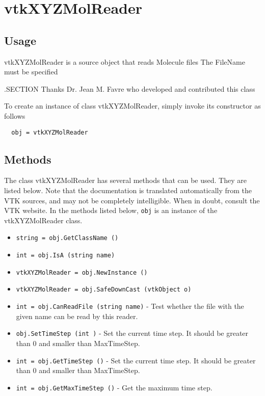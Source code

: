 \section{vtkXYZMolReader}

\subsection{Usage}

 vtkXYZMolReader is a source object that reads Molecule files
 The FileName must be specified

 .SECTION Thanks
 Dr. Jean M. Favre who developed and contributed this class

To create an instance of class vtkXYZMolReader, simply
invoke its constructor as follows
\begin{verbatim}
  obj = vtkXYZMolReader
\end{verbatim}
\subsection{Methods}

The class vtkXYZMolReader has several methods that can be used.
  They are listed below.
Note that the documentation is translated automatically from the VTK sources,
and may not be completely intelligible.  When in doubt, consult the VTK website.
In the methods listed below, \verb|obj| is an instance of the vtkXYZMolReader class.
\begin{itemize}
\item  \verb|string = obj.GetClassName ()|

\item  \verb|int = obj.IsA (string name)|

\item  \verb|vtkXYZMolReader = obj.NewInstance ()|

\item  \verb|vtkXYZMolReader = obj.SafeDownCast (vtkObject o)|

\item  \verb|int = obj.CanReadFile (string name)| -  Test whether the file with the given name can be read by this
 reader.

\item  \verb|obj.SetTimeStep (int )| -  Set the current time step. It should be greater than 0 and smaller than
 MaxTimeStep.

\item  \verb|int = obj.GetTimeStep ()| -  Set the current time step. It should be greater than 0 and smaller than
 MaxTimeStep.

\item  \verb|int = obj.GetMaxTimeStep ()| -  Get the maximum time step.

\end{itemize}
